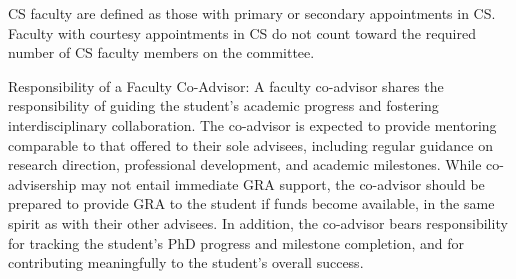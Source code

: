 CS faculty are defined as those with primary or secondary appointments in CS.
Faculty with courtesy appointments in CS do not count toward the required
number of CS faculty members on the committee.

Responsibility of a Faculty Co-Advisor: A faculty co-advisor shares the
responsibility of guiding the student’s academic progress and fostering
interdisciplinary collaboration. The co-advisor is expected to provide
mentoring comparable to that offered to their sole advisees, including regular
guidance on research direction, professional development, and academic
milestones. While co-advisership may not entail immediate GRA support, the
co-advisor should be prepared to provide GRA to the student if funds become
available, in the same spirit as with their other advisees. In addition, the
co-advisor bears responsibility for tracking the student’s PhD progress and
milestone completion, and for contributing meaningfully to the student’s
overall success.

